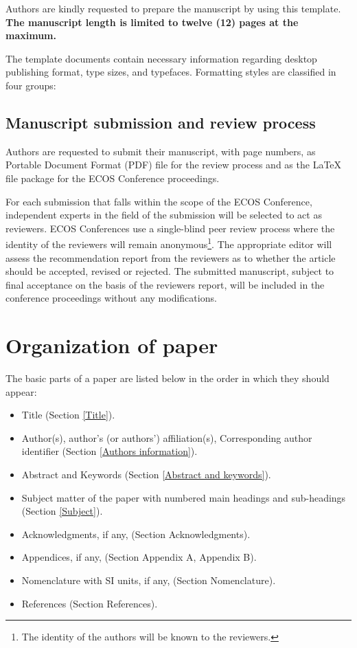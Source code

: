 \documentclass{ECOS_2021}
\begin{document}
Authors are kindly requested to prepare the manuscript by using this template. {\bf The manuscript length is limited to twelve (12) pages at the maximum.}

The template documents contain necessary information regarding desktop publishing format, type sizes, and typefaces. Formatting styles are classified in four groups:

\sffamily \large \subsection{Manuscript submission and review process} \label{Manuscript submission and review process}
\rmfamily \normalsize 
Authors are requested to submit their manuscript, with page numbers, as Portable Document Format (PDF) file for the review process and as the \LaTeX{} file package for the ECOS Conference proceedings.

For each submission that falls within the scope of the ECOS Conference, independent experts in the field of the submission will be selected to act as reviewers. ECOS Conferences use a single-blind peer review process where the identity of the reviewers will remain anonymous\footnote{The identity of the authors will be known to the reviewers.}. The appropriate editor will assess the recommendation report from the reviewers as to whether the article should be accepted, revised or rejected. The submitted manuscript, subject to final acceptance on the basis of the reviewers report, will be included in the conference proceedings without any modifications.

\sffamily \Large \section{Organization of paper} \label{Organization of paper}
\rmfamily \normalsize
The basic parts of a paper are listed below in the order in which they should appear:

\begin{itemize}
    \item Title (Section \ref{Title}).
    \item Author(s), author's (or authors') affiliation(s), Corresponding author identifier (Section \ref{Authors information}).
    \item Abstract and Keywords (Section \ref{Abstract and keywords}).
    \item Subject matter of the paper with numbered main headings and sub-headings (Section \ref{Subject}).
    \item Acknowledgments, if any, (Section Acknowledgments).
    \item Appendices, if any, (Section Appendix A, Appendix B).
    \item Nomenclature with SI units, if any, (Section Nomenclature).
    \item References (Section References).
\end{itemize}
\end{document}
